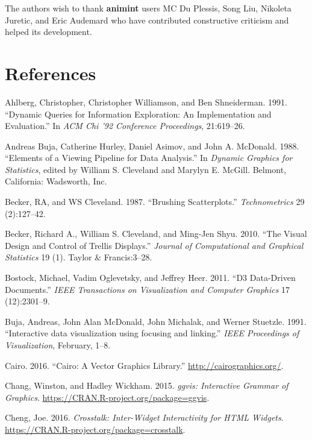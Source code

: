 \documentclass[12pt,]{article}
\theoremstyle{definition}
\theoremstyle{definition}
\theoremstyle{definition}
\theoremstyle{remark}
\begin{document}
The authors wish to thank \textbf{animint} users MC Du Plessis, Song
Liu, Nikoleta Juretic, and Eric Audemard who have contributed
constructive criticism and helped its development.

\section*{References}

\hypertarget{refs}{}
\leavevmode\hypertarget{ref-Ahlberg:1991}{}%
Ahlberg, Christopher, Christopher Williamson, and Ben Shneiderman. 1991.
``Dynamic Queries for Information Exploration: An Implementation and
Evaluation.'' In \emph{ACM Chi '92 Conference Proceedings}, 21:619--26.

\leavevmode\hypertarget{ref-viewing-pipeline}{}%
Andreas Buja, Catherine Hurley, Daniel Asimov, and John A. McDonald.
1988. ``Elements of a Viewing Pipeline for Data Analysis.'' In
\emph{Dynamic Graphics for Statistics}, edited by William S. Cleveland
and Marylyn E. McGill. Belmont, California: Wadsworth, Inc.

\leavevmode\hypertarget{ref-brushing-scatterplots}{}%
Becker, RA, and WS Cleveland. 1987. ``Brushing Scatterplots.''
\emph{Technometrics} 29 (2):127--42.

\leavevmode\hypertarget{ref-trellis}{}%
Becker, Richard A., William S. Cleveland, and Ming-Jen Shyu. 2010. ``The
Visual Design and Control of Trellis Displays.'' \emph{Journal of
Computational and Graphical Statistics} 19 (1). Taylor \& Francis:3--28.

\leavevmode\hypertarget{ref-d3}{}%
Bostock, Michael, Vadim Oglevetsky, and Jeffrey Heer. 2011. ``D3
Data-Driven Documents.'' \emph{IEEE Transactions on Visualization and
Computer Graphics} 17 (12):2301--9.

\leavevmode\hypertarget{ref-Buja:1991vh}{}%
Buja, Andreas, John Alan McDonald, John Michalak, and Werner Stuetzle.
1991. ``Interactive data visualization using focusing and linking.''
\emph{IEEE Proceedings of Visualization}, February, 1--8.

\leavevmode\hypertarget{ref-cairo}{}%
Cairo. 2016. ``Cairo: A Vector Graphics Library.''
\url{http://cairographics.org/}.

\leavevmode\hypertarget{ref-ggvis}{}%
Chang, Winston, and Hadley Wickham. 2015. \emph{ggvis: Interactive
Grammar of Graphics}. \url{https://CRAN.R-project.org/package=ggvis}.

\leavevmode\hypertarget{ref-crosstalk}{}%
Cheng, Joe. 2016. \emph{Crosstalk: Inter-Widget Interactivity for HTML
Widgets}. \url{https://CRAN.R-project.org/package=crosstalk}.
\end{document}

